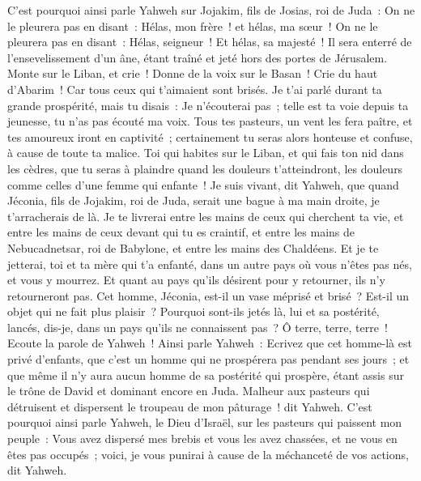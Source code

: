 \begin{multicols}{2}
C'est pourquoi ainsi parle Yahweh sur Jojakim, fils de Josias, roi de Juda~: On ne le pleurera pas en disant~: Hélas, mon frère~! et hélas, ma sœur~! On ne le pleurera pas en disant~: Hélas, seigneur~! Et hélas, sa majesté~!
Il sera enterré de l'ensevelissement d'un âne, étant traîné et jeté hors des portes de Jérusalem.
Monte sur le Liban, et crie~! Donne de la voix sur le Basan~! Crie du haut d'Abarim~! Car tous ceux qui t'aimaient sont brisés.
Je t'ai parlé durant ta grande prospérité, mais tu disais~: Je n'écouterai pas~; telle est ta voie depuis ta jeunesse, tu n'as pas écouté ma voix.
Tous tes pasteurs, un vent les fera paître, et tes amoureux iront en captivité~; certainement tu seras alors honteuse et confuse, à cause de toute ta malice.
Toi qui habites sur le Liban, et qui fais ton nid dans les cèdres, que tu seras à plaindre quand les douleurs t'atteindront, les douleurs comme celles d'une femme qui enfante~!
Je suis vivant, dit Yahweh, que quand Jéconia, fils de Jojakim, roi de Juda, serait une bague à ma main droite, je t'arracherais de là.
Je te livrerai entre les mains de ceux qui cherchent ta vie, et entre les mains de ceux devant qui tu es craintif, et entre les mains de Nebucadnetsar, roi de Babylone, et entre les mains des Chaldéens.
Et je te jetterai, toi et ta mère qui t'a enfanté, dans un autre pays où vous n'êtes pas nés, et vous y mourrez.
Et quant au pays qu'ils désirent pour y retourner, ils n'y retourneront pas.
Cet homme, Jéconia, est-il un vase méprisé et brisé~? Est-il un objet qui ne fait plus plaisir~? Pourquoi sont-ils jetés là, lui et sa postérité, lancés, dis-je, dans un pays qu'ils ne connaissent pas~?
Ô terre, terre, terre~! Ecoute la parole de Yahweh~!
Ainsi parle Yahweh~: Ecrivez que cet homme-là est privé d'enfants, que c'est un homme qui ne prospérera pas pendant ses jours~; et que même il n'y aura aucun homme de sa postérité qui prospère, étant assis sur le trône de David et dominant encore en Juda.
\VerseOne{}Malheur aux pasteurs qui détruisent et dispersent le troupeau de mon pâturage~! dit Yahweh.
C'est pourquoi ainsi parle Yahweh, le Dieu d'Israël, sur les pasteurs qui paissent mon peuple~: Vous avez dispersé mes brebis et vous les avez chassées, et ne vous en êtes pas occupés~; voici, je vous punirai à cause de la méchanceté de vos actions, dit Yahweh.

\end{multicols}

